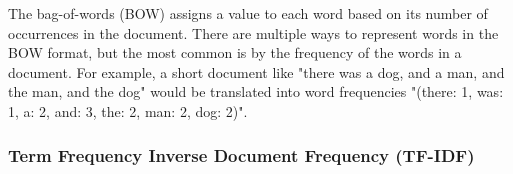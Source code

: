 
The bag-of-words (BOW)  assigns a value to each word based on its number of occurrences in the document. There are multiple ways to represent words in the BOW format, but the most common is by the frequency of the words in a document. For example, a short document like "there was a dog, and a man, and the man, and the dog" would be translated into word frequencies "(there: 1, was: 1, a: 2, and: 3, the: 2, man: 2, dog: 2)". %




\subsubsection{Term Frequency Inverse Document Frequency (TF-IDF)}

